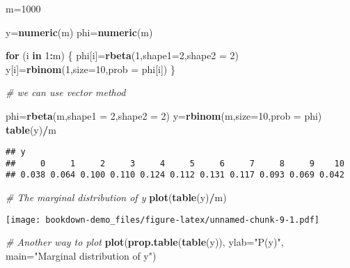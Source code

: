 \documentclass[]{book}
\newenvironment{Shaded}{\begin{snugshade}}{\end{snugshade}}
\newcommand{\KeywordTok}[1]{\textcolor[rgb]{0.13,0.29,0.53}{\textbf{#1}}}
\newcommand{\DataTypeTok}[1]{\textcolor[rgb]{0.13,0.29,0.53}{#1}}
\newcommand{\DecValTok}[1]{\textcolor[rgb]{0.00,0.00,0.81}{#1}}
\newcommand{\StringTok}[1]{\textcolor[rgb]{0.31,0.60,0.02}{#1}}
\newcommand{\CommentTok}[1]{\textcolor[rgb]{0.56,0.35,0.01}{\textit{#1}}}
\newcommand{\ControlFlowTok}[1]{\textcolor[rgb]{0.13,0.29,0.53}{\textbf{#1}}}
\newcommand{\OperatorTok}[1]{\textcolor[rgb]{0.81,0.36,0.00}{\textbf{#1}}}
\newcommand{\NormalTok}[1]{#1}
\begin{document}
\begin{Shaded}
\begin{Highlighting}[]
\NormalTok{m=}\DecValTok{1000}

\NormalTok{y=}\KeywordTok{numeric}\NormalTok{(m)}
\NormalTok{phi=}\KeywordTok{numeric}\NormalTok{(m)}

\ControlFlowTok{for}\NormalTok{ (i }\ControlFlowTok{in} \DecValTok{1}\OperatorTok{:}\NormalTok{m)}
\NormalTok{\{}
\NormalTok{  phi[i]=}\KeywordTok{rbeta}\NormalTok{(}\DecValTok{1}\NormalTok{,}\DataTypeTok{shape1=}\DecValTok{2}\NormalTok{,}\DataTypeTok{shape2 =} \DecValTok{2}\NormalTok{)}
\NormalTok{  y[i]=}\KeywordTok{rbinom}\NormalTok{(}\DecValTok{1}\NormalTok{,}\DataTypeTok{size=}\DecValTok{10}\NormalTok{,}\DataTypeTok{prob =}\NormalTok{ phi[i])}
\NormalTok{\}}

\CommentTok{# we can use vector method}

\NormalTok{phi=}\KeywordTok{rbeta}\NormalTok{(m,}\DataTypeTok{shape1 =} \DecValTok{2}\NormalTok{,}\DataTypeTok{shape2 =} \DecValTok{2}\NormalTok{)}
\NormalTok{y=}\KeywordTok{rbinom}\NormalTok{(m,}\DataTypeTok{size=}\DecValTok{10}\NormalTok{,}\DataTypeTok{prob =}\NormalTok{ phi)}
\KeywordTok{table}\NormalTok{(y)}\OperatorTok{/}\NormalTok{m}
\end{Highlighting}
\end{Shaded}

\begin{verbatim}
## y
##     0     1     2     3     4     5     6     7     8     9    10 
## 0.038 0.064 0.100 0.110 0.124 0.112 0.131 0.117 0.093 0.069 0.042
\end{verbatim}

\begin{Shaded}
\begin{Highlighting}[]
\CommentTok{# The marginal distribution of y}
\KeywordTok{plot}\NormalTok{(}\KeywordTok{table}\NormalTok{(y)}\OperatorTok{/}\NormalTok{m)}
\end{Highlighting}
\end{Shaded}

\texttt{[image: bookdown-demo\_files/figure-latex/unnamed-chunk-9-1.pdf]}

\begin{Shaded}
\begin{Highlighting}[]
\CommentTok{# Another way to plot }
\KeywordTok{plot}\NormalTok{(}\KeywordTok{prop.table}\NormalTok{(}\KeywordTok{table}\NormalTok{(y)), }\DataTypeTok{ylab=}\StringTok{"P(y)"}\NormalTok{, }\DataTypeTok{main=}\StringTok{"Marginal distribution of y"}\NormalTok{)}
\end{Highlighting}
\end{Shaded}
\end{document}
